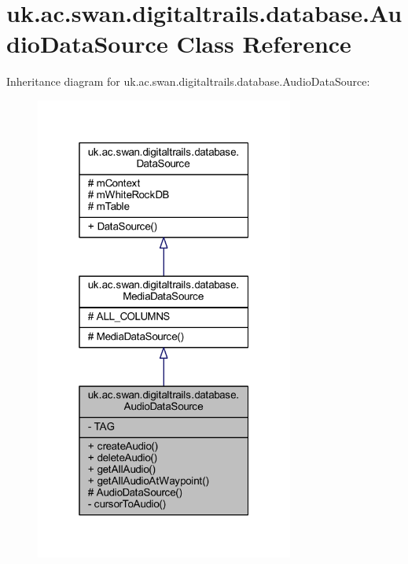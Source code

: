 \hypertarget{classuk_1_1ac_1_1swan_1_1digitaltrails_1_1database_1_1_audio_data_source}{\section{uk.\+ac.\+swan.\+digitaltrails.\+database.\+Audio\+Data\+Source Class Reference}
\label{classuk_1_1ac_1_1swan_1_1digitaltrails_1_1database_1_1_audio_data_source}
}


Inheritance diagram for uk.\+ac.\+swan.\+digitaltrails.\+database.\+Audio\+Data\+Source\+:
\nopagebreak
\begin{figure}[H]
\begin{center}
\leavevmode
\includegraphics[width=241pt]{classuk_1_1ac_1_1swan_1_1digitaltrails_1_1database_1_1_audio_data_source__inherit__graph}
\end{center}
\end{figure}


